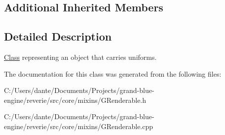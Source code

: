 \subsection*{Additional Inherited Members}


\subsection{Detailed Description}
\mbox{\hyperlink{struct_class}{Class}} representing an object that carries uniforms. 

The documentation for this class was generated from the following files\+:\begin{DoxyCompactItemize}
\item 
C\+:/\+Users/dante/\+Documents/\+Projects/grand-\/blue-\/engine/reverie/src/core/mixins/G\+Renderable.\+h\item 
C\+:/\+Users/dante/\+Documents/\+Projects/grand-\/blue-\/engine/reverie/src/core/mixins/G\+Renderable.\+cpp\end{DoxyCompactItemize}

